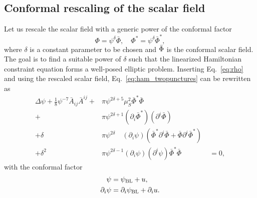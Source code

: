\subsection{Conformal rescaling of the scalar field}
Let us rescale the scalar field with a generic power of the conformal factor
\begin{equation}
    \Phi = \psi^\delta \bar{\Phi},
    \quad
    \Phi^* = \psi^\delta \bar{\Phi}^*,
\end{equation}
where $\delta$ is a constant parameter to be chosen
and $\Bar{\Phi}$ is the conformal scalar field.
The goal is to find a suitable power of $\delta$ such that the linearized Hamiltonian
constraint equation forms a well-posed elliptic problem.
Inserting Eq.~\eqref{eq:rho}
and using the rescaled scalar field, Eq.~\eqref{eq:ham_twopunctures} can be rewritten as
\begin{align}
    \Delta\psi
    + \frac{1}{8} \psi^{-7} \bar{A}_{ij} \bar{A}^{ij}
    +
    &\pi \psi^{2\delta + 5}
    \mu_S^2 \bar{\Phi}^* \bar{\Phi}
    \nonumber
    \\
    +
    &\pi \psi^{2\delta + 1}
    (\partial_i\bar{\Phi}^*)
    (\partial^i\bar{\Phi})
    \nonumber
    \\
    + \delta
    &\pi \psi^{2\delta}\quad
    (\partial_i\psi)
    ( \bar{\Phi}^* \partial^i\bar{\Phi}
    + \bar{\Phi} \partial^i\bar{\Phi}^* )
    \nonumber
    \\
    + \delta^2
    &\pi \psi^{2\delta-1} (\partial_i\psi) (\partial^i\psi)
    \bar{\Phi}^* \bar{\Phi}
    \quad\quad\quad\quad
    = 0,
    \label{eq:nonlin_ham_eq}
\end{align}
with the conformal factor
\begin{align}
    \psi 
    &= \psi_{\rm BL} + u,
    \\
    \partial_i\psi 
    &= \partial_i\psi_{\rm BL} + \partial_i u.
\end{align}

